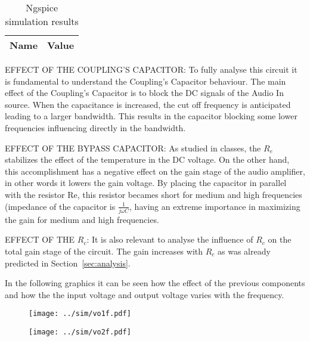 \begin{table}[!ht]
  \centering
  \begin{tabular}{|l|r|}
    \hline    
    {\bf Name} & {\bf Value } \\ \hline
    
  \end{tabular}
  \caption{Ngspice simulation results}
  \label{tab:ng4}
\end{table}

\par EFFECT OF THE COUPLING'S CAPACITOR: To fully analyse this circuit it is fundamental to understand the Coupling's Capacitor behaviour. The main effect of the Coupling's Capacitor is to block the DC signals of the Audio In source. When the capacitance is increased, the cut off frequency is anticipated leading to a larger bandwidth. This results in the capacitor blocking some lower frequencies influencing directly in the bandwidth.

\par EFFECT OF THE BYPASS CAPACITOR: As studied in classes, the $R_e$ stabilizes the effect of the temperature in the DC voltage. On the other hand, this accomplishment has a negative effect on the gain stage of the audio amplifier, in other words it lowers the gain voltage. By placing the capacitor in parallel with the resistor Re, this resistor becames short for medium and high frequencies (impedance of the capacitor is $\frac{1}{j\omega C}$, having an extreme importance in maximizing the gain for medium and high frequencies.

\par EFFECT OF THE $R_c$: It is also relevant to analyse the influence of $R_c$ on the total gain stage of the circuit. The gain increases with $R_c$ as was already predicted in Section~\ref{sec:analysis}.

\par In the following graphics it can be seen how the effect of the previous components and how the the input voltage and output voltage varies with the frequency.

\begin{figure} [ht]
\centering
\begin{minipage}{.5\textwidth}
  \centering
  \texttt{[image: ../sim/vo1f.pdf]}
  \label{fig:sim41}
\end{minipage}%
\begin{minipage}{.5\textwidth}
  \centering
  \texttt{[image: ../sim/vo2f.pdf]}
  \label{fig:vout_env}
\end{minipage}
\end{figure}

